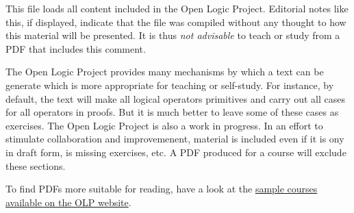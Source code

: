 \documentclass[../include/open-logic-part]{subfiles}
\begin{document}
\clearpage

\begin{editorial}
This file loads all content included in the Open Logic Project.
Editorial notes like this, if displayed, indicate that the file was
compiled without any thought to how this material will be presented.
It is thus \emph{not advisable} to teach or study from a PDF that
includes this comment.

The Open Logic Project provides many mechanisms by which a text can be
generate which is more appropriate for teaching or self-study.  For
instance, by default, the text will make all logical operators
primitives and carry out all cases for all operators in proofs.  But
it is much better to leave some of these cases as exercises. The Open
Logic Project is also a work in progress. In an effort to stimulate
collaboration and improvemenent, material is included even if it is
ony in draft form, is missing exercises, etc.  A PDF produced for a
course will exclude these sections.

To find PDFs more suitable for
reading, have a look at the
\href{http://people.ucalgary.ca/~rzach/static/open-logic/courses/}{sample
  courses available on the OLP website}.
\end{editorial}











\end{document}
